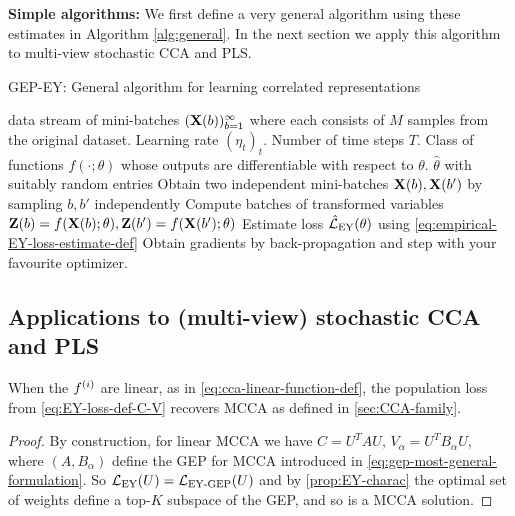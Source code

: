 \textbf{Simple algorithms:}
We first define a very general algorithm using these estimates in Algorithm \ref{alg:general}.
In the next section we apply this algorithm to multi-view stochastic CCA and PLS.

\begin{algorithm}
    \caption{GEP-EY: General algorithm for learning correlated representations}
    \label{alg:general}
    \begin{algorithmic}
         data stream of mini-batches $(\mathbf{X}(b))_{b=1}^\infty$ where each consists of $M$ samples from the original dataset. Learning rate $(\eta_t)_t$. Number of time steps $T$. Class of functions $f(\cdot; \theta)$ whose outputs are differentiable with respect to $\theta$.
         $\hat{\theta}$ with suitably random entries
        \STATE Obtain two independent mini-batches \( \mathbf{X}(b), \mathbf{X}(b') \) by sampling \( b, b' \) independently
        \STATE Compute batches of transformed variables $\mathbf{Z}(b) = f(\mathbf{X}(b); \theta), \mathbf{Z}(b') = f(\mathbf{X}(b'); \theta)$
        \STATE Estimate loss $\hat{\mathcal{L}}_\text{EY}(\theta)$ using \cref{eq:empirical-EY-loss-estimate-def}
        \STATE Obtain gradients by back-propagation and step with your favourite optimizer.
        \ENDFOR
    \end{algorithmic}
\end{algorithm}

\subsection{Applications to (multi-view) stochastic CCA and PLS}
\begin{lemma}
    When the $f^{(i)}$ are linear, as in \cref{eq:cca-linear-function-def}, the population loss from \cref{eq:EY-loss-def-C-V} recovers MCCA as defined in \cref{sec:CCA-family}. %
\end{lemma}
\begin{proof}
    By construction, for linear MCCA we have $C = U^T A U,\, V_\alpha=U^T B_\alpha U$, where $(A, B_\alpha)$ define the GEP for MCCA introduced in \cref{eq:gep-most-general-formulation}.
    So $\mathcal{L}_\text{EY}(U) = \mathcal{L}_\text{EY-GEP}(U)$ and by \cref{prop:EY-charac} the optimal set of weights define a top-$K$ subspace of the GEP, and so is a MCCA solution.
\end{proof}

